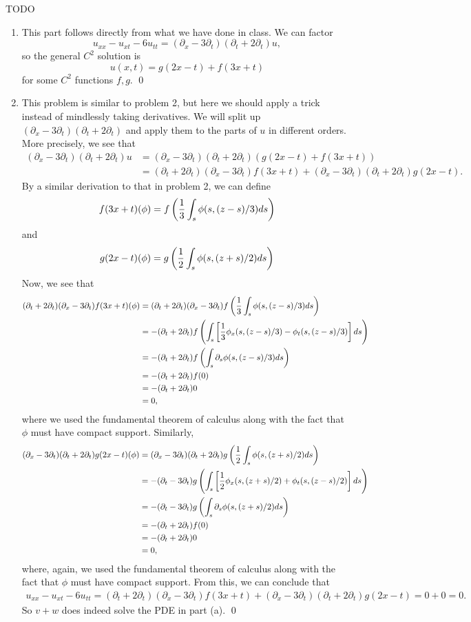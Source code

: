 \documentclass{article}
\renewcommand{\d}{\partial}
\begin{document}
\newpage
{} TODO \tri
\hop
\solution
\begin{enumerate}
    \item This part follows directly from what we have done in class. We can factor 
    \[u_{xx}-u_{xt}-6u_{tt} = (\d_x - 3\d_t)(\d_t + 2\d_t)u,\]
    so the general $C^2$ solution is 
    \[u(x,t) = g(2x-t) + f(3x + t)\]
    for some $C^2$ functions $f,g$. \qed
    \item This problem is similar to problem 2, but here we should apply a trick instead of mindlessly taking derivatives. We will split up $ (\d_x - 3\d_t)(\d_t + 2\d_t)$ and apply them to the parts of $u$ in different orders. More precisely, we see that 
    \begin{align*}
        (\d_x - 3\d_t)(\d_t + 2\d_t)u &= (\d_x - 3\d_t)(\d_t + 2\d_t)( g(2x-t) + f(3x + t)) \\ 
        &= (\d_t + 2\d_t)(\d_x - 3\d_t)f(3x + t) +  (\d_x - 3\d_t)(\d_t + 2\d_t)g(2x-t).
    \end{align*}
    By a similar derivation to that in problem 2, we can define 
    \[f(3x+t)(\phi) = f\del{\frac{1}{3}\int_s \phi(s, (z-s)/3)ds}\]
    and 
    \[g(2x-t)(\phi) = g\del{\frac{1}{2}\int_s \phi(s, (z+s)/2)ds}\]
    Now, we see that 
    \begin{align*}
        (\d_t + 2\d_t)(\d_x - 3\d_t)f(3x + t)(\phi) &= (\d_t + 2\d_t)(\d_x - 3\d_t)f\del{\frac{1}{3}\int_s \phi(s, (z-s)/3)ds} \\
        &=-(\d_t + 2\d_t)f\del{\int_s \sbr{\frac{1}{3}\phi_x(s, (z-s)/3) - \phi_t(s, (z-s)/3)}ds}\\
        &= -(\d_t + 2\d_t)f\del{\int_s \d_s \phi(s, (z-s)/3)ds} \\
        &= -(\d_t + 2\d_t)f(0)\\
        &= -(\d_t + 2\d_t)0\\
        &=0,
    \end{align*}
    where we used the fundamental theorem of calculus along with the fact that $\phi$ must have compact support. 
    \hop 
    Similarly,
    \begin{align*}
        (\d_x - 3\d_t)(\d_t + 2\d_t)g(2x - t)(\phi) &= (\d_x - 3\d_t)(\d_t + 2\d_t)g\del{\frac{1}{2}\int_s \phi(s, (z+s)/2)ds} \\
        &=-(\d_t - 3\d_t)g\del{\int_s \sbr{\frac{1}{2}\phi_x(s, (z+s)/2) + \phi_t(s, (z-s)/2)}ds}\\
        &= -(\d_t - 3\d_t)g\del{\int_s \d_s \phi(s, (z+s)/2)ds} \\
        &= -(\d_t + 2\d_t)f(0)\\
        &= -(\d_t + 2\d_t)0\\
        &=0,
    \end{align*}
    where, again, we used the fundamental theorem of calculus along with the fact that $\phi$ must have compact support. 
    \hop 
    From this, we can conclude that 
    \begin{align*}
        u_{xx}-u_{xt}-6u_{tt} = (\d_t + 2\d_t)(\d_x - 3\d_t)f(3x + t) +  (\d_x - 3\d_t)(\d_t + 2\d_t)g(2x-t) = 0+0 = 0.
    \end{align*}
    So $v+w$ does indeed solve the PDE in part (a). \qed
\end{enumerate}
\end{document}
